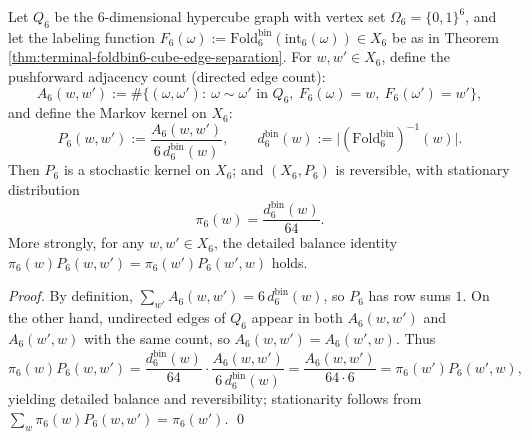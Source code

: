 \begin{enumerate}
  

  \begin{theorem}\label{thm:terminal-foldbin6-pushforward-markov}
  Let \(Q_6\) be the \(6\)-dimensional hypercube graph with vertex set \(\Omega_6=\{0,1\}^6\), and let the labeling function
  \(
  F_6(\omega):=\mathrm{Fold}^{\mathrm{bin}}_6(\mathrm{int}_6(\omega))\in X_6
  \)
  be as in Theorem \ref{thm:terminal-foldbin6-cube-edge-separation}.
  For \(w,w'\in X_6\), define the pushforward adjacency count (directed edge count):
  \[
  A_6(w,w')
  :=\#\bigl\{(\omega,\omega'):\ \omega\sim\omega'\text{ in }Q_6,\ F_6(\omega)=w,\ F_6(\omega')=w'\bigr\},
  \]
  and define the Markov kernel on \(X_6\):
  \[
  P_6(w,w'):=\frac{A_6(w,w')}{6\,d^{\mathrm{bin}}_6(w)},
  \qquad d^{\mathrm{bin}}_6(w):=\bigl|(\mathrm{Fold}^{\mathrm{bin}}_6)^{-1}(w)\bigr|.
  \]
  Then \(P_6\) is a stochastic kernel on \(X_6\); and \((X_6,P_6)\) is reversible, with stationary distribution
  \[
  \pi_6(w)=\frac{d^{\mathrm{bin}}_6(w)}{64}.
  \]
  More strongly, for any \(w,w'\in X_6\), the detailed balance identity
  \(
  \pi_6(w)P_6(w,w')=\pi_6(w')P_6(w',w)
  \)
  holds.
  \end{theorem}
  \begin{proof}
  By definition, \(\sum_{w'}A_6(w,w')=6\,d^{\mathrm{bin}}_6(w)\), so \(P_6\) has row sums \(1\).
  On the other hand, undirected edges of \(Q_6\) appear in both \(A_6(w,w')\) and \(A_6(w',w)\) with the same count, so \(A_6(w,w')=A_6(w',w)\).
  Thus
  \[
  \pi_6(w)P_6(w,w')=\frac{d^{\mathrm{bin}}_6(w)}{64}\cdot\frac{A_6(w,w')}{6\,d^{\mathrm{bin}}_6(w)}
  =\frac{A_6(w,w')}{64\cdot 6}
  =\pi_6(w')P_6(w',w),
  \]
  yielding detailed balance and reversibility; stationarity follows from \(\sum_w \pi_6(w)P_6(w,w')=\pi_6(w')\). \qed
  \end{proof}
  

  


\end{enumerate}
